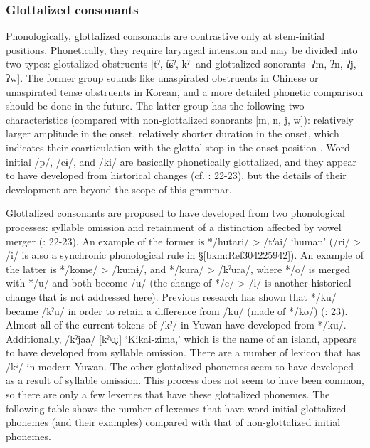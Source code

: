 \subsubsection{Glottalized consonants}
\label{bkm:Ref347180773}\hypertarget{RefHeadingToc395696974}{}
Phonologically, glottalized consonants are contrastive only at stem-initial positions. Phonetically, they require laryngeal intension and may be divided into two types: glottalized obstruents [tˀ, t͡ɕˀ, kˀ] and glottalized sonorants [ʔm, ʔn, ʔj, ʔw]. The former group sounds like unaspirated obstruents in Chinese or unaspirated tense obstruents in Korean, and a more detailed phonetic comparison should be done in the future. The latter group has the following two characteristics (compared with non-glottalized sonorants [m, n, j, w]):  relatively larger amplitude in the onset,  relatively shorter duration in the onset, which indicates their coarticulation with the glottal stop in the onset position \citep{NiinagaEtAl2011}. Word initial /p/, /cɨ/, and /ki/ are basically phonetically glottalized, and they appear to have developed from historical changes (cf. \citealt{HirayamaEtAl1966}: 22-23), but the details of their development are beyond the scope of this grammar.

Glottalized consonants are proposed to have developed from two phonological processes:  syllable omission and  retainment of a distinction affected by vowel merger (\citealt{HirayamaEtAl1966}: 22-23). An example of the former is */hutari/ > /tˀai/ ‘human’ (/ri/ > /i/ is also a synchronic phonological rule in §\ref{bkm:Ref304225942}). An example of the latter is */kome/ > /kumɨ/, and */kura/ > /kˀura/, where */o/ is merged with */u/ and both become /u/ (the change of */e/ > /ɨ/ is another historical change that is not addressed here). Previous research has shown that */ku/ became /kˀu/ in order to retain a difference from /ku/ (made of */ko/) (\citealt{HirayamaEtAl1966}: 23). Almost all of the current tokens of /kˀ/ in Yuwan have developed from */ku/. Additionally, /kˀjaa/ [kˀʲɑ̟ː] ‘Kikai-zima,’ which is the name of an island, appears to have developed from syllable omission. There are a number of lexicon that has /kˀ/ in modern Yuwan. The other glottalized phonemes seem to have developed as a result of syllable omission. This process does not seem to have been common, so there are only a few lexemes that have these glottalized phonemes. The following table shows the number of lexemes that have word-initial glottalized phonemes (and their examples) compared with that of non-glottalized initial phonemes.

